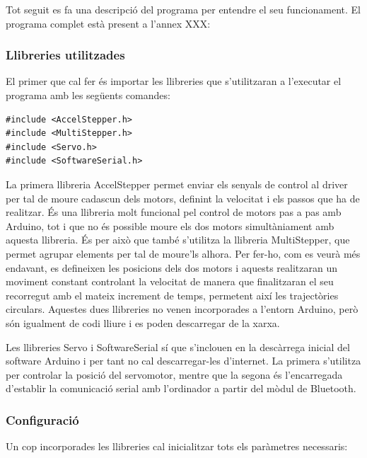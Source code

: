 Tot seguit es fa una descripció del programa per entendre el seu funcionament. El programa complet està present a l’annex XXX:

\subsubsection{Llibreries utilitzades}

El primer que cal fer és importar les llibreries que s’utilitzaran a l'executar el programa amb les següents comandes:

\begin{lstlisting}[style=Arduino]
#include <AccelStepper.h>
#include <MultiStepper.h>
#include <Servo.h>
#include <SoftwareSerial.h>
\end{lstlisting}

La primera llibreria AccelStepper permet enviar els senyals de control al driver per tal de moure cadascun dels motors, definint la velocitat i els passos que ha de realitzar. És una llibreria molt funcional pel control de motors pas a pas amb Arduino, tot i que no és possible moure els dos motors simultàniament amb aquesta llibreria. És per això que també s’utilitza la llibreria MultiStepper, que permet agrupar elements per tal de moure’ls alhora. Per fer-ho, com es veurà més endavant, es defineixen les posicions dels dos motors i aquests realitzaran un moviment constant controlant la velocitat de manera que finalitzaran el seu recorregut amb el mateix increment de temps, permetent així les trajectòries circulars. Aquestes dues llibreries no venen incorporades a l'entorn Arduino, però són igualment de codi lliure i es poden descarregar de la xarxa.

Les llibreries Servo i SoftwareSerial sí que s’inclouen en la descàrrega inicial del software Arduino i per tant no cal descarregar-les d’internet. La primera s’utilitza per controlar la posició del servomotor, mentre que la segona és l’encarregada d’establir la comunicació serial amb l’ordinador a partir del mòdul de Bluetooth. 

\subsubsection{Configuració}

Un cop incorporades les llibreries cal inicialitzar tots els paràmetres necessaris: 

